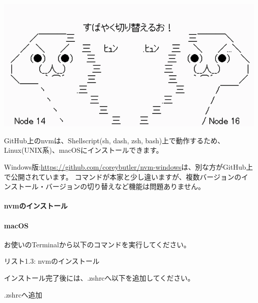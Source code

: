\begin{reviewimage}[H]%
\includegraphics[width=0.6\maxwidth]{./images/01-createDevEnv/switchNodejs.png}%
\label{image:01-createDevEnv:switchNodejs}
\end{reviewimage}
\vspace*{\baselineskip}

GitHub上のnvmは、Shellscript(sh, dash, zsh, bash)上で動作するため、Linux(UNIX系)、macOSにインストールできます。

\vspace*{\baselineskip}

Windows版:\url{https://github.com/coreybutler/nvm-windows}は、別な方がGitHub上で公開されています。
コマンドが本家と少し違いますが、複数バージョンのインストール・バージョンの切り替えなど機能は問題ありません。

\paragraph*{nvmのインストール}
\paragraph*{macOS}
お使いのTerminalから以下のコマンドを実行してください。

\def\startercodeblockfontsize{}
\begin{starterterminal}[_076588580]{リスト1.3: nvmのインストール}\end{starterterminal}

インストール完了後には、.zshrcへ以下を追加してください。

\def\startercodeblockfontsize{}
\begin{starterterminal}[]{.zshrcへ追加}\end{starterterminal}
\ParagraphEnd

